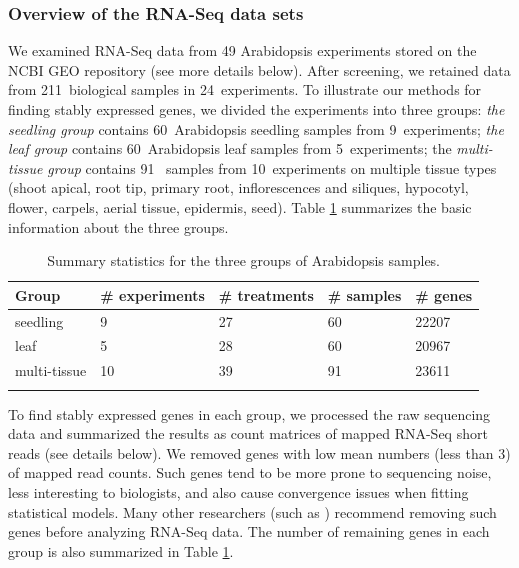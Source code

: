 \documentclass[letterpaper,12pt]{article}
\newcommand{\howmanySamples}{211~}
\newcommand{\howmanylab}{24~}
\newcommand{\howmanyseedlingsample}{60~}
\newcommand{\howmanyleafsample}{60~}
\newcommand{\howmanytissuesample}{91~}
\newcommand{\howmanyseedlingexperiment}{9~}
\newcommand{\howmanyleafexperiment}{5~}
\newcommand{\howmanytissueexperiment}{10~}
\begin{document}
\subsubsection*{Overview of the RNA-Seq data sets}
We examined RNA-Seq data from 49 Arabidopsis experiments stored on the NCBI
GEO repository (see more details below). After screening, we retained data
from \howmanySamples biological samples in \howmanylab experiments.  To illustrate our methods
for finding stably expressed genes, we divided the experiments into three
groups: \textit{the seedling group} contains \howmanyseedlingsample Arabidopsis seedling samples
from \howmanyseedlingexperiment experiments; \textit{ the leaf group} contains \howmanyleafsample Arabidopsis leaf
samples from \howmanyleafexperiment experiments;  the \textit{multi-tissue group} contains \howmanytissuesample
samples from \howmanytissueexperiment experiments on multiple tissue types (shoot apical, root tip,
primary root, inflorescences and siliques, hypocotyl, flower, carpels, aerial
tissue, epidermis, seed).  Table \ref{table:TableSet3} summarizes the basic information about
the three groups.
\begin{table}[!ht]
    \centering
    \caption{Summary statistics for the three groups of Arabidopsis samples.}
    \begin{tabular}{lp{2.4cm}p{2.3cm}p{2cm}p{1.5cm}} \hline
	Group & \#  experiments & \# treatments  & \# samples & \# genes \\ \hline
	seedling &   9 &  27 &  60 & 22207 \\ 
	leaf &   5 &  28 &  60 & 20967 \\ 
	multi-tissue &  10 &  39 &  91 & 23611 \\ \hline
	\label{table:TableSet3}
    \end{tabular}
\end{table}

To find stably expressed genes in each group, we processed the raw
sequencing data and summarized the results as count matrices of mapped RNA-Seq
short reads (see details below).  We removed genes with low mean numbers (less
than 3) of mapped read counts.  Such genes tend to be more prone to sequencing
noise, less interesting to biologists, and also cause convergence issues when
fitting statistical models. Many other researchers (such as \citealt{anders2013count})
recommend removing such genes before analyzing RNA-Seq data.  The number of
remaining genes in each group is also summarized in Table
\ref{table:TableSet3}.
\end{document}
